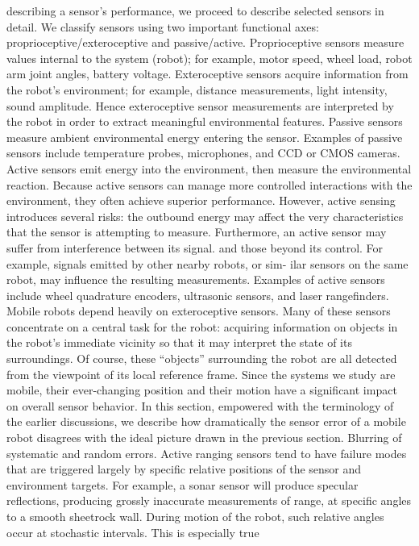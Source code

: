 describing a sensor’s performance, we proceed to describe selected sensors in detail.
We classify sensors using two important functional axes: proprioceptive/exteroceptive and
passive/active.
Proprioceptive sensors measure values internal to the system (robot); for example,
motor speed, wheel load, robot arm joint angles, battery voltage.
Exteroceptive sensors acquire information from the robot’s environment; for example,
distance measurements, light intensity, sound amplitude. Hence exteroceptive sensor measurements 
are interpreted by the robot in order to extract meaningful environmental features.
Passive sensors measure ambient environmental energy entering the sensor. Examples
of passive sensors include temperature probes, microphones, and CCD or CMOS cameras.
Active sensors emit energy into the environment, then measure the environmental reaction.
Because active sensors can manage more controlled interactions with the environment,
they often achieve superior performance. However, active sensing introduces several
risks: the outbound energy may affect the very characteristics that the sensor is attempting
to measure. Furthermore, an active sensor may suffer from interference between its signal.
and those beyond its control. For example, signals emitted by other nearby robots, or sim-
ilar sensors on the same robot, may influence the resulting measurements. Examples of
active sensors include wheel quadrature encoders, ultrasonic sensors, and laser rangefinders.
Mobile robots depend heavily on exteroceptive sensors. Many of these sensors concentrate
on a central task for the robot: acquiring information on objects in the robot’s immediate
vicinity so that it may interpret the state of its surroundings. Of course, these ``objects'' 
surrounding the robot are all detected from the viewpoint of its local reference frame. Since
the systems we study are mobile, their ever-changing position and their motion have a 
significant impact on overall sensor behavior. In this section, empowered with the terminology 
of the earlier discussions, we describe how dramatically the sensor error of a mobile robot 
disagrees with the ideal picture drawn in the previous section.
Blurring of systematic and random errors. Active ranging sensors tend to have failure
modes that are triggered largely by specific relative positions of the sensor and environment
targets. For example, a sonar sensor will produce specular reflections, producing grossly
inaccurate measurements of range, at specific angles to a smooth sheetrock wall. During
motion of the robot, such relative angles occur at stochastic intervals. This is especially true
